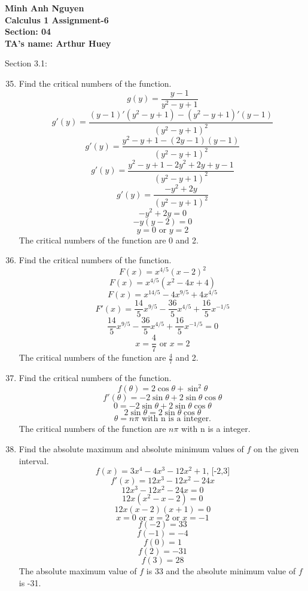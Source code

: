 \documentclass[12pt]{article}
\begin{document}
\textbf{Minh Anh Nguyen }\\
\textbf{Calculus 1 Assignment-6}\\
\textbf{Section: 04}\\
\textbf{TA's name: Arthur Huey}

\hrulefill

Section 3.1:

\begin{enumerate}
    \setcounter{enumi}{34}
    \item Find the critical numbers of the function.\\
        \[g(y) = \frac{y-1}{y^2-y+1}\]
        \[g'(y) = \frac{(y-1)'(y^2-y+1) - (y^2-y+1)'(y-1)}{(y^2-y+1)^2}\]
        \[g'(y) = \frac{y^2-y+1 - (2y-1)(y-1)}{(y^2-y+1)^2}\]
        \[g'(y) = \frac{y^2-y+1 - 2y^2+2y+y-1}{(y^2-y+1)^2}\]
        \[g'(y) = \frac{-y^2+2y}{(y^2-y+1)^2}\]
        \[-y^2+2y=0\]
        \[-y(y-2)=0\]
        \[y = 0 \text{ or } y = 2\]
        The critical numbers of the function are 0 and 2.
    \setcounter{enumi}{40}
    \item Find the critical numbers of the function.
        \[F(x) = x^{4/5}(x-2)^2\]
        \[F(x) = x^{4/5}(x^2-4x+4)\]
        \[F(x) = x^{14/5}-4x^{9/5}+4x^{4/5}\]
        \[F'(x) = \frac{14}{5}x^{9/5}-\frac{36}{5}x^{4/5}+\frac{16}{5}x^{-1/5}\]
        \[\frac{14}{5}x^{9/5}-\frac{36}{5}x^{4/5}+\frac{16}{5}x^{-1/5}=0\]
        \[x = \frac{4}{7} \text{ or } x = 2\]
        The critical numbers of the function are ${\displaystyle \frac{4}{7}}$ and 2.
    \newpage
    \setcounter{enumi}{44}
    \item Find the critical numbers of the function.
        \[f(\theta) = 2\cos\theta + \sin^2\theta\]
        \[f'(\theta) = -2\sin\theta + 2\sin\theta\cos\theta\]
        \[0 = -2\sin\theta + 2\sin\theta\cos\theta\]
        \[2\sin\theta = 2\sin\theta\cos\theta\]
        \[\theta = n\pi \text{ with n is a integer.}\]
        The critical numbers of the function are $n\pi$ with n is a integer.
    \setcounter{enumi}{52}
    \item Find the absolute maximum and absolute minimum values of $f$ on the given interval.
        \[f(x)=3x^4-4x^3-12x^2+1\text{, [-2,3]}\]
        \[f'(x)=12x^3-12x^2-24x\]
        \[12x^3-12x^2-24x=0\]
        \[12x(x^2-x-2)=0\]
        \[12x(x-2)(x+1)=0\]
        \[x = 0 \text{ or } x = 2 \text{ or } x=-1\]
        \[f(-2) = 33\]
        \[f(-1) = -4\]
        \[f(0) = 1\]
        \[f(2) = -31\]
        \[f(3) = 28\]
        The absolute maximum value of $f$ is 33 and the absolute minimum value of $f$ is -31.

\end{enumerate}
\end{document}
